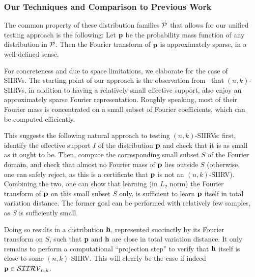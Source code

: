 \subsubsection{Our Techniques and Comparison to Previous Work} \label{ssec:techniques}

The common property of these distribution families $\property$ that allows for our unified testing approach
is the following: Let $\p$ be the probability mass function of any distribution in $\property$. Then the Fourier transform
of $\p$ is approximately sparse, in a well-defined sense. 

For concreteness and due to space limitations,  we elaborate for the case of SIIRVs.
The starting point of our approach is the observation from~\cite{DKS:15} that $(n,k)$-SIIRVs, 
in addition to having a relatively small effective support, also enjoy an approximately sparse Fourier representation. 
Roughly speaking, most of their Fourier mass is concentrated on a small subset of Fourier coefficients, which can be computed efficiently.

This suggests the following natural approach to testing $(n,k)$-SIIRVs: first, identify the effective support $I$ of the distribution $\p$ 
and check that it is as small as it ought to be. Then, compute the corresponding small subset $S$ of the Fourier domain, 
and check that almost no Fourier mass of $\p$ lies outside $S$ (otherwise, one can safely reject, as this is a certificate that $\p$ is not an $(n,k)$-SIIRV). 
Combining the two, one can show that learning (in $L_2$ norm) the Fourier transform of $\p$ on this small subset $S$ only, 
is sufficient to learn $\p$ itself in total variation distance. The former goal can be performed with relatively few samples, as $S$ is sufficiently small.

Doing so results in a distribution $\h$, represented succinctly by its Fourier transform on $S$, such that $\p$ and $\h$ are close in total variation distance. 
It only remains to perform a computational ``projection step'' to verify that $\h$ itself is close to some $(n,k)$-SIIRV. 
This will clearly be the case if indeed $\p\in\classksiirv[n]{k}$.

